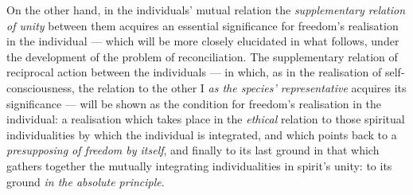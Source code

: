 \documentclass[12pt,a4paper]{book}
\begin{document}
On the other hand, in the individuals' mutual relation the \emph{supplementary
relation of unity} between them acquires an essential significance for
freedom's realisation in the individual --- which will be more closely
elucidated in what follows, under the development of the problem of
reconciliation. The supplementary relation of reciprocal action between the
individuals --- in which, as in the realisation of self-consciousness, the
relation to the other I \emph{as the species' representative} acquires its
significance --- will be shown as the condition for freedom's realisation in
the individual: a realisation which takes place in the \emph{ethical} relation
to those spiritual individualities by which the individual is integrated, and
which points back to a \emph{presupposing of freedom by itself}, and finally to
its last ground in that which gathers together the mutually integrating
individualities in spirit's unity: to its ground \emph{in the absolute
principle}.
\end{document}
